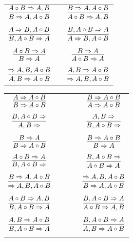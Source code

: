 \documentclass[11pt]{article}
\begin{document}
\begin{center}
\begin{tabular}{ccc}
$\infer{B\Rightarrow A, A\circ B}{A\circ B\Rightarrow A, B}$ && $\infer{A\circ B\Rightarrow A, B}{B\Rightarrow A, A\circ B}$ \\
&& \\
$\infer{B, A\circ B\Rightarrow A}{A\Rightarrow B, A\circ B}$ && $\infer{A\Rightarrow B, A\circ B}{B, A\circ B\Rightarrow A}$ \\
&& \\
$\infer{B\Rightarrow A}{A\circ B\Rightarrow A}$ && $\infer{A\circ B\Rightarrow A}{B\Rightarrow A}$ \\
&& \\
$\infer{A, B\Rightarrow A\circ B}{\Rightarrow A, B, A\circ B}$ && $\infer{\Rightarrow A, B, A\circ B}{A, B\Rightarrow A\circ B}$ \\
\end{tabular}

\begin{tabular}{ccc}
$\infer{B\Rightarrow A\circ B}{A\Rightarrow A\circ B}$ && $\infer{A\Rightarrow A\circ B}{B\Rightarrow A\circ B}$ \\
&& \\
$\infer{A, B\Rightarrow }{B, A\circ B\Rightarrow }$ && $\infer{B, A\circ B\Rightarrow }{A, B\Rightarrow }$ \\
&& \\
$\infer{B\Rightarrow A\circ B}{B\Rightarrow A}$ && $\infer{B\Rightarrow A}{B\Rightarrow A\circ B}$ \\
&& \\
$\infer{B, A\circ B\Rightarrow }{A\circ B\Rightarrow A}$ && $\infer{A\circ B\Rightarrow A}{B, A\circ B\Rightarrow }$ \\
&& \\
$\infer{\Rightarrow A, B, A\circ B}{B\Rightarrow A, A\circ B}$ && $\infer{B\Rightarrow A, A\circ B}{\Rightarrow A, B, A\circ B}$ \\
&& \\
$\infer{B, A\circ B\Rightarrow A}{A\circ B\Rightarrow A, B}$ & \ \ \ \ & $\infer{A\circ B\Rightarrow A, B}{B, A\circ B\Rightarrow A}$ \\
&& \\
$\infer{B, A\circ B\Rightarrow A}{A, B\Rightarrow A\circ B}$ && $\infer{A, B\Rightarrow A\circ B}{B, A\circ B\Rightarrow A}$ \\
&& \\

\end{tabular}

\end{center}
\end{document}
